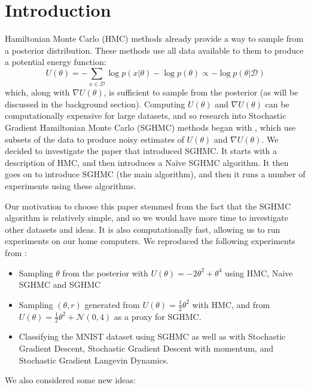 
\section{Introduction}

Hamiltonian Monte Carlo (HMC) methods already provide a way to sample from a posterior distribution. These methods use all data available to them to produce a potential energy function:
\begin{equation*}
    U(\theta) = - \sum_{x\in\mathcal{D}}\log p(x| \theta) - \log p(\theta ) \propto -\log p(\theta | \mathcal{D})
\end{equation*}
which, along with $\nabla U(\theta)$, is sufficient to sample from the posterior (as will be discussed in the background section). Computing $U(\theta)$ and $\nabla U(\theta)$ can be computationally expensive for large datasets, and so research into Stochastic Gradient Hamiltonian Monte Carlo (SGHMC) methods began with \cite{sghmc}, which use subsets of the data to produce noisy estimates of $U(\theta)$ and $\nabla U(\theta)$. We decided to investigate the paper that introduced SGHMC. It starts with a description of HMC, and then introduces a Naïve SGHMC algorithm. It then goes on to introduce SGHMC (the main algorithm), and then it runs a number of experiments using these algorithms.

Our motivation to choose this paper stemmed from the fact that the SGHMC algorithm is relatively simple, and so we would have more time to investigate other datasets and ideas. It is also computationally fast, allowing us to run experiments on our home computers. We reproduced the following experiments from \cite{sghmc}:

\begin{itemize}
    \item Sampling $\theta$ from the posterior with $U(\theta) = -2\theta^2 + \theta^4$ using HMC, Naive SGHMC and SGHMC
    \item Sampling $(\theta,r)$ generated from $U(\theta) = \frac{1}{2}\theta^2$ with HMC, and from $U(\theta) = \frac{1}{2}\theta^2 + \mathcal{N}(0,4)$ as a proxy for SGHMC.
    \item Classifying the MNIST dataset \cite{mnist} using SGHMC as well as with Stochastic Gradient Descent, Stochastic Gradient Descent with momentum, and Stochastic Gradient Langevin Dynamics.
\end{itemize}

We also considered some new ideas:

